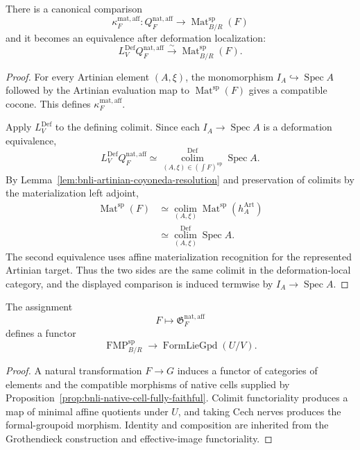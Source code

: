 \begin{theorem}
\label{thm:bnli-affine-native-quotient-materialization}
There is a canonical comparison
\[
    \kappa_F^{\mathrm{mat,aff}}:
    Q_F^{\mathrm{nat,aff}}
    \longrightarrow
    \operatorname{Mat}^{\mathrm{sp}}_{B/R}(F)
\]
and it becomes an equivalence after deformation localization:
\[
\boxed{
    L_V^{\mathrm{Def}}Q_F^{\mathrm{nat,aff}}
    \xrightarrow{\sim}
    \operatorname{Mat}^{\mathrm{sp}}_{B/R}(F).}
\]
\end{theorem}

\begin{proof}
For every Artinian element $(A,\xi)$, the monomorphism
$I_A\hookrightarrow\operatorname{Spec}A$ followed by the Artinian evaluation
map to $\operatorname{Mat}^{\mathrm{sp}}(F)$ gives a compatible cocone.  This
defines $\kappa_F^{\mathrm{mat,aff}}$.

Apply $L_V^{\mathrm{Def}}$ to the defining colimit.  Since each
$I_A\to\operatorname{Spec}A$ is a deformation equivalence,
\[
    L_V^{\mathrm{Def}}Q_F^{\mathrm{nat,aff}}
    \simeq
    \operatorname*{colim}_{(A,\xi)\in(\int F)^{\mathrm{op}}}^{\mathrm{Def}}
    \operatorname{Spec}A.
\]
By Lemma~\ref{lem:bnli-artinian-coyoneda-resolution} and preservation of
colimits by the materialization left adjoint,
\[
\begin{aligned}
    \operatorname{Mat}^{\mathrm{sp}}(F)
    &\simeq
    \operatorname*{colim}_{(A,\xi)}
    \operatorname{Mat}^{\mathrm{sp}}(h_A^{\mathrm{Art}})\\
    &\simeq
    \operatorname*{colim}_{(A,\xi)}^{\mathrm{Def}}
    \operatorname{Spec}A.
\end{aligned}
\]
The second equivalence uses affine materialization recognition for the
represented Artinian target.  Thus the two sides are the same colimit in the
deformation-local category, and the displayed comparison is induced termwise
by $I_A\to\operatorname{Spec}A$.
\end{proof}

\begin{proposition}
\label{prop:bnli-affine-native-functoriality}
The assignment
\[
    F\longmapsto\mathfrak G_F^{\mathrm{nat,aff}}
\]
defines a functor
\[
    \operatorname{FMP}^{\mathrm{sp}}_{B/R}
    \longrightarrow
    \operatorname{FormLieGpd}(U/V).
\]
\end{proposition}

\begin{proof}
A natural transformation $F\to G$ induces a functor of categories of elements
and the compatible morphisms of native cells supplied by
Proposition~\ref{prop:bnli-native-cell-fully-faithful}.  Colimit functoriality
produces a map of minimal affine quotients under $U$, and taking Cech nerves
produces the formal-groupoid morphism.  Identity and composition are inherited
from the Grothendieck construction and effective-image functoriality.
\end{proof}

